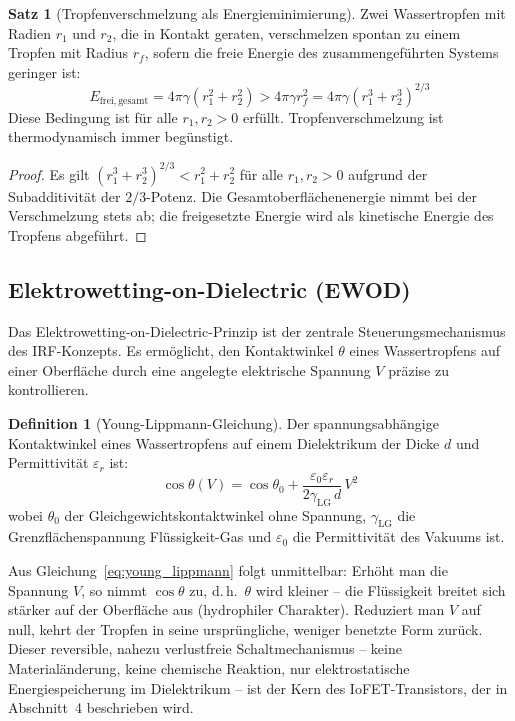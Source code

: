 ﻿\documentclass[a4paper,12pt]{scrreprt}
\theoremstyle{definition}
\newtheorem{definition}{Definition}[section]
\newtheorem{satz}{Satz}[section]
\begin{document}
\begin{satz}[Tropfenverschmelzung als Energieminimierung]
	Zwei Wassertropfen mit Radien $r_1$ und $r_2$, die in Kontakt geraten,
	verschmelzen spontan zu einem Tropfen mit Radius $r_f$, sofern die freie
	Energie des zusammengeführten Systems geringer ist:
	\begin{equation}
		E_{\mathrm{frei, gesamt}} = 4\pi\gamma(r_1^2 + r_2^2) > 4\pi\gamma r_f^2
		= 4\pi\gamma(r_1^3 + r_2^3)^{2/3}
		\label{eq:energieminimierung}
	\end{equation}
	Diese Bedingung ist für alle $r_1, r_2 > 0$ erfüllt. Tropfenverschmelzung
	ist thermodynamisch immer begünstigt.
\end{satz}

\begin{proof}
	Es gilt $(r_1^3 + r_2^3)^{2/3} < r_1^2 + r_2^2$ für alle $r_1, r_2 > 0$
	aufgrund der Subadditivität der $2/3$-Potenz. Die Gesamtoberflächenenergie
	nimmt bei der Verschmelzung stets ab; die freigesetzte Energie wird als
	kinetische Energie des Tropfens abgeführt.
\end{proof}

\subsection{Elektrowetting-on-Dielectric (EWOD)}

Das Elektrowetting-on-Dielectric-Prinzip ist der zentrale Steuerungsmechanismus
des IRF-Konzepts. Es ermöglicht, den Kontaktwinkel $\theta$ eines Wassertropfens
auf einer Oberfläche durch eine angelegte elektrische Spannung $V$ präzise
zu kontrollieren.

\begin{definition}[Young-Lippmann-Gleichung]
	Der spannungsabhängige Kontaktwinkel eines Wassertropfens auf einem
	Dielektrikum der Dicke $d$ und Permittivität $\varepsilon_r$ ist:
	\begin{equation}
		\cos\theta(V) = \cos\theta_0 + \frac{\varepsilon_0 \varepsilon_r}{2\gamma_{\mathrm{LG}}\, d}\, V^2
		\label{eq:young_lippmann}
	\end{equation}
	wobei $\theta_0$ der Gleichgewichtskontaktwinkel ohne Spannung,
	$\gamma_{\mathrm{LG}}$ die Grenzflächenspannung Flüssigkeit-Gas und $\varepsilon_0$
	die Permittivität des Vakuums ist.
\end{definition}

Aus Gleichung~\eqref{eq:young_lippmann} folgt unmittelbar: Erhöht man die
Spannung $V$, so nimmt $\cos\theta$ zu, d.\,h.\ $\theta$ wird kleiner -- die
Flüssigkeit breitet sich stärker auf der Oberfläche aus (hydrophiler Charakter).
Reduziert man $V$ auf null, kehrt der Tropfen in seine ursprüngliche, weniger
benetzte Form zurück. Dieser reversible, nahezu verlustfreie
Schaltmechanismus -- keine Materialänderung, keine chemische Reaktion,
nur elektrostatische Energiespeicherung im Dielektrikum -- ist der
Kern des IoFET-Transistors, der in Abschnitt~4 beschrieben wird.
\end{document}
